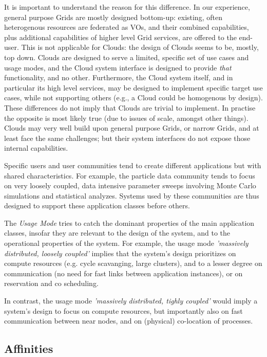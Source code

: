 \documentclass{article}
\newcommand{\I}[1]{\textit{#1}}
\begin{document}
  It is important to understand the reason for this difference.  In
  our experience, general purpose Grids are mostly designed bottom-up:
  existing, often heterogenous resources are federated as VOs, and
  their combined capabilities, plus additional capabilities of higher
  level Grid services, are offered to the end-user.  This is not
  applicable for Clouds: the design of Clouds seems to be, mostly, top
  down. Clouds are designed to serve a limited, specific set of use
  cases and usage modes, and the Cloud system interface is designed to
  provide \I{that} functionality, and no other.  Furthermore, the
  Cloud system itself, and in particular its high level services, may
  be designed to implement specific target use cases, while not
  supporting others (e.g., a Cloud could be homogenous by design).
  These differences do not imply that Clouds are trivial to implement.
  In practise the opposite is most likely true (due to issues of
  scale, amongst other things). Clouds may very well build upon
  general purpose Grids, or narrow Grids, and at least face the same
  challenges; but their system interfaces do not expose those internal
  capabilities.

  Specific users and user communities tend to create different
  applications but with shared characteristics.  For example, the
  particle data community tends to focus on very loosely coupled, data
  intensive parameter sweeps involving Monte Carlo simulations and
  statistical analyzes.  Systems used by these communities are thus
  designed to support these application classes before others.
  
  The \I{Usage Mode} tries to catch the dominant
  properties of the main application classes, insofar they are
  relevant to the design of the system, and to the operational
  properties of the system.  For example, the usage mode \I{'massively
  distributed, loosely coupled'} implies that the system's design
  prioritizes on compute resources (e.g. cycle scavanging, large
  clusters), and to a lesser degree on communication (no need for fast
  links between application instances), or on reservation and co
  scheduling.

  In contrast, the usage mode \I{'massively distributed, tighly
  coupled'} would imply a system's design to focus on compute
  resources, but importantly also on fast communication between near
  nodes, and on (physical) co-location of processes.


 \subsection{Affinities}
\end{document}

